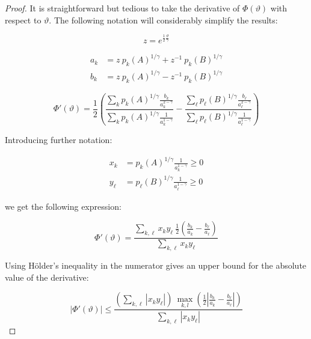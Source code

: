 \documentclass{article}
\theoremstyle{definition}
\begin{document}
\begin{proof}
It is straightforward but tedious to take the derivative of $\Phi(\vartheta)$ with respect to $\vartheta$. The following notation will considerably simplify the results:

\begin{equation}
    z = e^{\frac{1}{2} \frac{\vartheta}{\gamma}}
\end{equation}

\begin{equation}
    \begin{split}
        a_k &= z \ p_k(A)^{1/\gamma} + z^{-1} \ p_k(B)^{1/\gamma} \\
        b_k &= z \ p_k(A)^{1/\gamma} - z^{-1} \ p_k(B)^{1/\gamma}
    \end{split}
\end{equation}

\begin{equation}
    \Phi'(\vartheta) = 
    \frac{1}{2} 
    \left (
    \frac {\sum_k p_k(A)^{1/\gamma} 
    \frac{b_k}{a_k^{2-\gamma}}}
    {\sum_k p_k(A)^{1/\gamma} 
    \frac{1}{a_k^{1-\gamma}}} - 
    \frac {\sum_\ell p_\ell(B)^{1/\gamma} 
    \frac{b_\ell}{a_\ell^{2-\gamma}}}
    {\sum_\ell p_\ell(B)^{1/\gamma} 
    \frac{1}{a_\ell^{1-\gamma}}}
    \right )
\end{equation}

Introducing further notation:

\begin{equation}
    \begin{split}
        x_k &= p_k(A)^{1/\gamma} 
        \frac{1}{a_k^{1-\gamma}} \ge 0 \\
        y_\ell &= p_\ell(B)^{1/\gamma} 
        \frac{1}{a_\ell^{1-\gamma}} \ge 0
    \end{split}
\end{equation}

we get the following expression:

\begin{equation}
    \Phi'(\vartheta) = 
    \frac
    {\sum_{k,\ell} x_k y_\ell \ \frac{1}{2} \left ( \frac{b_k}{a_k} - \frac{b_\ell}{a_\ell} \right )}
    {\sum_{k,\ell} x_k y_\ell}
\end{equation}

Using Hölder's inequality \cite{book:Holder} in the numerator gives an upper bound for the absolute value of the derivative:

\begin{equation}
    |\Phi'(\vartheta)| \le 
    \frac
    {\left (\sum_{k,\ell} |x_k y_\ell| \right ) \ 
    \max_{k,l} \left ( \frac{1}{2} \left | \frac{b_k}{a_k} - \frac{b_\ell}{a_\ell} \right | \right )}
    {\sum_{k,\ell} |x_k y_\ell|}
\end{equation}


\end{proof}
\end{document}
